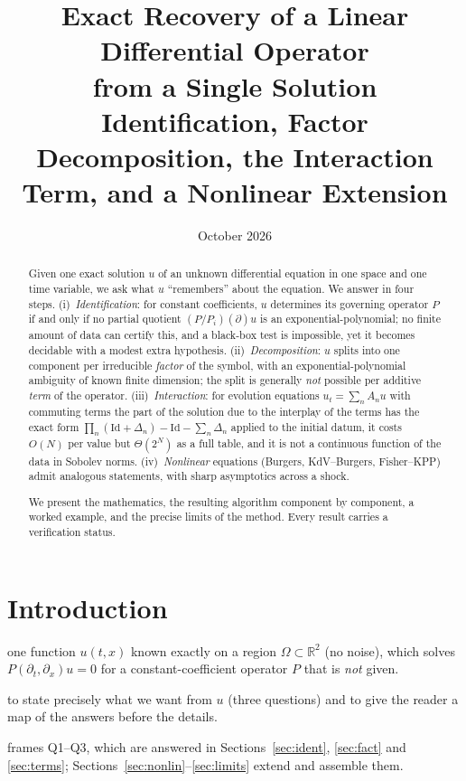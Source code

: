 \documentclass[11pt,a4paper]{article}
\title{\textbf{Exact Recovery of a Linear Differential Operator\\ from a Single Solution}\\[4pt]
\large Identification, Factor Decomposition, the Interaction Term, and a Nonlinear Extension}
\author{}
\date{October 2026}
\theoremstyle{definition}
\newcommand{\sectionbrief}[3]{\begin{leadin}\begin{description}[nosep,leftmargin=3.0cm,labelwidth=2.8cm]
  \item[Starting from] #1
  \item[Why this section] #2
  \item[Role in the paper] #3
  \end{description}\end{leadin}}
\newcommand{\R}{\mathbb{R}}\newcommand{\C}{\mathbb{C}}\newcommand{\N}{\mathbb{N}}\newcommand{\Z}{\mathbb{Z}}
\newcommand{\Id}{\mathrm{Id}}
\begin{document}
\maketitle

\begin{abstract}
\noindent
Given one exact solution $u$ of an unknown differential equation in one space and one time variable, we ask what $u$ ``remembers'' about the equation. We answer in four steps. (i)~\emph{Identification}: for constant coefficients, $u$ determines its governing operator $P$ if and only if no partial quotient $(P/P_i)(\partial)u$ is an exponential-polynomial; no finite amount of data can certify this, and a black-box test is impossible, yet it becomes decidable with a modest extra hypothesis. (ii)~\emph{Decomposition}: $u$ splits into one component per irreducible \emph{factor} of the symbol, with an exponential-polynomial ambiguity of known finite dimension; the split is generally \emph{not} possible per additive \emph{term} of the operator. (iii)~\emph{Interaction}: for evolution equations $u_t=\sum_nA_nu$ with commuting terms the part of the solution due to the interplay of the terms has the exact form $\prod_n(\Id+\Delta_n)-\Id-\sum_n\Delta_n$ applied to the initial datum, it costs $O(N)$ per value but $\Theta(2^N)$ as a full table, and it is not a continuous function of the data in Sobolev norms. (iv)~\emph{Nonlinear} equations (Burgers, KdV--Burgers, Fisher--KPP) admit analogous statements, with sharp asymptotics across a shock.

\medskip\noindent We present the mathematics, the resulting algorithm component by component, a worked example, and the precise limits of the method. Every result carries a verification status.
\end{abstract}

\tableofcontents
\bigskip

\section{Introduction}\label{sec:intro}
\sectionbrief
{one function $u(t,x)$ known exactly on a region $\Omega\subset\R^2$ (no noise), which solves $P(\partial_t,\partial_x)u=0$ for a constant-coefficient operator $P$ that is \emph{not} given.}
{to state precisely what we want from $u$ (three questions) and to give the reader a map of the answers before the details.}
{frames Q1--Q3, which are answered in Sections~\ref{sec:ident}, \ref{sec:fact} and \ref{sec:terms}; Sections~\ref{sec:nonlin}--\ref{sec:limits} extend and assemble them.}
\end{document}
